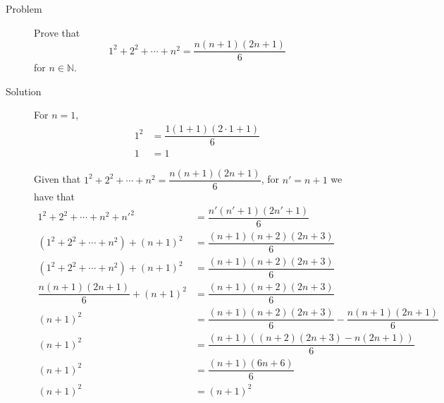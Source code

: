 \begin{description}
\item[Problem] Prove that
$$1^2 + 2^2 + \cdots + n^2 = \dfrac{n(n+1)(2n+1)}{6}$$
for $n \in \mathbb{N}$.

\item[Solution] For $n = 1$,
\begin{equation*}\begin{aligned}
1^2 &= \dfrac{1(1 + 1)(2 \cdot 1 + 1)}{6} \\
1   &= 1
\end{aligned}\end{equation*}

Given that $1^2 + 2^2 + \cdots + n^2 = \dfrac{n(n+1)(2n+1)}{6}$, for $n' = n +
1$ we have that
\begin{equation*}\begin{aligned}
1^2 + 2^2 + \cdots + n^2 + n'^2 &= \dfrac{n'(n'+1)(2n'+1)}{6} \\
(1^2 + 2^2 + \cdots + n^2) + (n+1)^2 &= \dfrac{(n+1)(n+2)(2n+3)}{6} \\
(1^2 + 2^2 + \cdots + n^2) + (n+1)^2 &= \dfrac{(n+1)(n+2)(2n+3)}{6} \\
\dfrac{n(n+1)(2n+1)}{6} + (n+1)^2 &= \dfrac{(n+1)(n+2)(2n+3)}{6} \\
(n+1)^2 &= \dfrac{(n+1)(n+2)(2n+3)}{6} - \dfrac{n(n+1)(2n+1)}{6} \\
(n+1)^2 &= \dfrac{(n+1)\left((n+2)(2n+3) - n(2n+1)\right)}{6} \\
(n+1)^2 &= \dfrac{(n+1)\left(6n + 6\right)}{6} \\
(n+1)^2 &= (n+1)^2
\end{aligned}\end{equation*}

\end{description}
